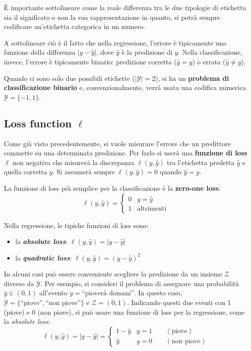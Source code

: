 \documentclass[a4paper]{article}
\newcommand{\quotes}[1]{``#1''}
\newcommand{\Y}{\ensuremath{\mathcal{Y}}}
\newcommand{\Z}{\ensuremath{\mathcal{Z}}}
\newcommand{\loss}{\ensuremath{\ell}}
\begin{document}
È importante sottolineare come la reale differenza tra le due tipologie di etichetta sia il
significato e non la sua rappresentazione in quanto, si potrà sempre codificare
un'etichetta categorica in un numero.

A sottolineare ciò è il fatto che nella regressione, l'errore è tipicamente una funzione della
differenza $| y-\hat{y} |$, dove $\hat{y}$ è la predizione di $y$. Nella classificazione, invece,
l'errore è tipicamente binario: predizione corretta ($\hat{y}=y$) o errata ($\hat{y}\neq y$).

Quando ci sono solo due possibili etichette ($|\Y|=2$), si ha un \textbf{problema di classificazione
binario} e, convenzionalmente, verrà usata una codifica numerica $\Y=\{-1,1\}$.

\subsection{Loss function $\loss$}
Come già visto precedentemente, si vuole misurare l'errore che un predittore commette su una
determinata predizione. Per farlo si userà una \textbf{funzione di loss} $\loss$ non negativa 
che misurerà la discrepanza $\loss(y,\hat{y})$ tra l'etichetta predetta $\hat{y}$ e quella
corretta $y$. Si assumerà sempre $\loss(y,\hat{y})=0$ quando $\hat{y}=y$.

La funzione di loss più semplice per la classificazione è la \textbf{zero-one loss}:
$$ \loss(y,\hat{y}) = \begin{cases} 0 & y=\hat{y} \\ 1 & \text{altrimenti} \end{cases} $$

Nella regressione, le tipiche funzioni di loss sono:
\begin{itemize}
    \item la \textit{\textbf{absolute loss}}: $\loss(y,\hat{y}) = |y-\hat{y}|$
    \item la \textit{\textbf{quadratic loss}}: $\loss(y,\hat{y}) = (y-\hat{y})^2$
\end{itemize}

In alcuni casi può essere conveniente scegliere la predizione da un insieme $\Z$ diverso da $\Y$.
Per esempio, si consideri il problema di assegnare una probabilità $\hat{y}\in (0,1)$ all'evento
$y=\text{\quotes{pioverà domani}}$. In questo caso, $\Y=\{\text{\quotes{piove}},\text{
\quotes{non piove}}\}$ e $\Z = (0,1)$. Indicando questi due eventi con 1 (piove) e 0 (non piove),
si può usare una funzione di loss per la regressione, come la \textit{absolute loss}:
$$ \loss(y,\hat{y}) = |y-\hat{y}| =  \begin{cases} 1-\hat{y} & y=1 \qquad (\text{piove}) \\
\hat{y} & y=0 \qquad (\text{non piove}) \end{cases} $$
\end{document}
